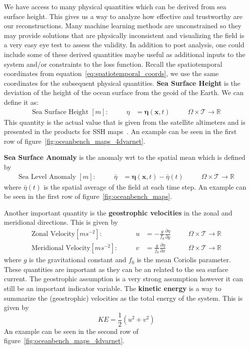 We have access to many physical quantities which can be derived from sea surface height. 
This gives us a way to analyze how effective and trustworthy are our reconstructions. 
Many machine learning methods are unconstrained so they may provide solutions that are physically inconsistent and visualizing the field is a very easy eye test to assess the validity. 
In addition to post analysis, one could include some of these derived quantities maybe useful as additional inputs to the system and/or constraints to the loss function. 
Recall the spatiotemporal coordinates from equation~\ref{eq:spatiotemporal_coords}, 
we use the same coordinates for the subsequent physical quantities. \textbf{Sea Surface Height} is the deviation of the height of the ocean surface from the geoid of the Earth. We can define it as:
\begin{align}
	\text{Sea Surface Height }[m]:&& \quad
 \eta &= \boldsymbol{\eta}(\mathbf{x},t)&& \quad \Omega\times \mathcal{T}\rightarrow\mathbb{R} \label{eq:ssh}
\end{align}
This quantity is the actual value that is given from the satellite altimeters and is presented in the products for SSH maps~\cite{DUACS}. An example can be seen in the first row of figure~\ref{fig:oceanbench_maps_4dvarnet}.

\textbf{Sea Surface Anomaly} is the anomaly wrt to the spatial mean which is defined by
\begin{align}
	\text{Sea Level Anomaly }[m]:&& \quad
 \bar{\eta} &= \boldsymbol{\eta}(\mathbf{x},t) - \bar{\eta}(t) &&
 \quad \Omega\times \mathcal{T}\rightarrow\mathbb{R} \label{eq:sla}
\end{align}
where $\bar{\eta}(t)$ is the spatial average of the field at each time step.  
An example can be seen in the first row of figure~\ref{fig:oceanbench_maps}.

Another important quantity is the \textbf{geostrophic velocities} in the zonal and meridional directions. This is given by
\begin{align}
	\text{Zonal Velocity}[ms^{-2}]:&& \quad
 u &= -\frac{g}{f_0}\frac{\partial \eta}{\partial y} &&
 \quad \Omega\times \mathcal{T}\rightarrow\mathbb{R} \label{eq:u_vel} \\
	\text{Meridional Velocity}[ms^{-2}]:&& \quad
 v &= \frac{g}{f_0}\frac{\partial \eta}{\partial x} &&
 \quad \Omega\times \mathcal{T}\rightarrow\mathbb{R} \label{eq:v_vel}
\end{align}
where $g$ is the gravitational constant and $f_0$ is the mean Coriolis parameter. These quantities are important as they can be an related to the sea surface current. The geostrophic assumption is a very strong assumption however it can still be an important indicator variable. The \textbf{kinetic energy} is a way to summarize the (geostrophic) velocities as the total energy of the system. This is given by
\begin{equation} \label{eq:kineticenergy}
    KE = \frac{1}{2}\left(u^2 + v^2\right)
\end{equation}
An example can be seen in the second row of figure~\ref{fig:oceanbench_maps_4dvarnet}.

